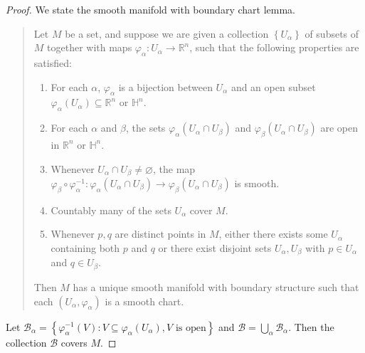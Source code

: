 \begin{proof}
    We state the smooth manifold with boundary chart lemma.
    \begin{quotation}
        Let \( M \) be a set, and suppose we are given a collection \( \left\{ U_{\alpha} \right\} \) of subsets of \( M \) together with maps \( \varphi_{\alpha}: U_{\alpha} \to \mathbb{R}^{n} \), such that the following properties are satisfied:
        \begin{enumerate}[itemsep=0pt,label={(\roman*)}]
            \item For each \( \alpha \), \( \varphi_{\alpha} \) is a bijection between \( U_{\alpha} \) and an open subset \( \varphi_{\alpha}(U_{\alpha}) \subseteq \mathbb{R}^{n} \) or \( \mathbb{H}^{n} \).
            \item For each \( \alpha \) and \( \beta \), the sets \( \varphi_{\alpha}(U_{\alpha} \cap U_{\beta}) \) and \( \varphi_{\beta}(U_{\alpha} \cap U_{\beta}) \) are open in \( \mathbb{R}^{n} \) or \( \mathbb{H}^{n} \).
            \item Whenever \( U_{\alpha} \cap U_{\beta} \ne \varnothing \), the map \( \varphi_{\beta} \circ \varphi_{\alpha}^{-1}: \varphi_{\alpha}(U_{\alpha} \cap U_{\beta}) \to \varphi_{\beta}(U_{\alpha} \cap U_{\beta}) \) is smooth.
            \item Countably many of the sets \( U_{\alpha} \) cover \( M \).
            \item Whenever \( p, q \) are distinct points in \( M \), either there exists some \( U_{\alpha} \) containing both \(p\) and \(q\) or there exist disjoint sets \( U_{\alpha}, U_{\beta} \) with \( p \in U_{\alpha} \) and \( q \in U_{\beta} \).
        \end{enumerate}

        Then \( M \) has a unique smooth manifold with boundary structure such that each \( (U_{\alpha}, \varphi_{\alpha}) \) is a smooth chart.
    \end{quotation}

    Let \( \mathcal{B}_{\alpha} = \left\{ \varphi_{\alpha}^{-1}(V) : V \subseteq \varphi_{\alpha}(U_{\alpha}), V \text{ is open} \right\} \) and \( \mathcal{B} = \bigcup_{\alpha} \mathcal{B}_{\alpha} \). Then the collection \( \mathcal{B} \) covers \( M \).


\end{proof}

